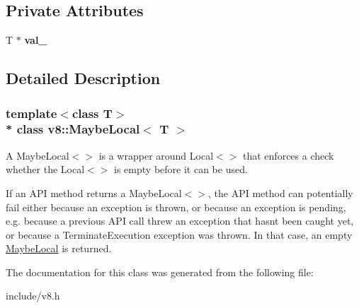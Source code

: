 \subsection*{Private Attributes}
\begin{DoxyCompactItemize}
\item 
T $\ast$ {\bfseries val\+\_\+}\hypertarget{classv8_1_1_maybe_local_aaaa3e33a607bc6d243fe00875a345cc5}{}\label{classv8_1_1_maybe_local_aaaa3e33a607bc6d243fe00875a345cc5}

\end{DoxyCompactItemize}


\subsection{Detailed Description}
\subsubsection*{template$<$class T$>$\\*
class v8\+::\+Maybe\+Local$<$ T $>$}

A Maybe\+Local$<$$>$ is a wrapper around Local$<$$>$ that enforces a check whether the Local$<$$>$ is empty before it can be used.

If an A\+PI method returns a Maybe\+Local$<$$>$, the A\+PI method can potentially fail either because an exception is thrown, or because an exception is pending, e.\+g. because a previous A\+PI call threw an exception that hasn\textquotesingle{}t been caught yet, or because a Terminate\+Execution exception was thrown. In that case, an empty \hyperlink{classv8_1_1_maybe_local}{Maybe\+Local} is returned. 

The documentation for this class was generated from the following file\+:\begin{DoxyCompactItemize}
\item 
include/v8.\+h\end{DoxyCompactItemize}
